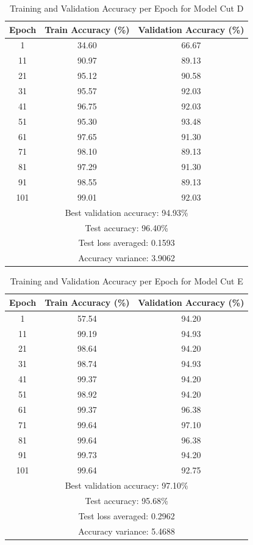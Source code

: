 \documentclass[11pt]{scrartcl}
\begin{document}
\begin{table}[htbp]
\centering
\caption{Training and Validation Accuracy per Epoch for Model Cut D}
\begin{tabular}{ccc}
\toprule
\textbf{Epoch} & \textbf{Train Accuracy (\%)} & \textbf{Validation Accuracy (\%)} \\
\midrule
1    & 34.60  & 66.67 \\
11   & 90.97  & 89.13 \\
21   & 95.12  & 90.58 \\
31   & 95.57  & 92.03 \\
41   & 96.75  & 92.03 \\
51   & 95.30  & 93.48 \\
61   & 97.65  & 91.30 \\
71   & 98.10  & 89.13 \\
81   & 97.29  & 91.30 \\
91   & 98.55  & 89.13 \\
101  & 99.01  & 92.03 \\
\midrule
\multicolumn{3}{c}{Best validation accuracy: 94.93\%} \\
\midrule
\multicolumn{3}{c}{Test accuracy: 96.40\%} \\
\multicolumn{3}{c}{Test loss averaged: 0.1593} \\
\multicolumn{3}{c}{Accuracy variance: 3.9062} \\
\bottomrule
\end{tabular}
\label{tab:task3-bonus-cutd-accuracy}
\end{table}

\begin{table}[htbp]
\centering
\caption{Training and Validation Accuracy per Epoch for Model Cut E}
\begin{tabular}{ccc}
\toprule
\textbf{Epoch} & \textbf{Train Accuracy (\%)} & \textbf{Validation Accuracy (\%)} \\
\midrule
1    & 57.54  & 94.20 \\
11   & 99.19  & 94.93 \\
21   & 98.64  & 94.20 \\
31   & 98.74  & 94.93 \\
41   & 99.37  & 94.20 \\
51   & 98.92  & 94.20 \\
61   & 99.37  & 96.38 \\
71   & 99.64  & 97.10 \\
81   & 99.64  & 96.38 \\
91   & 99.73  & 94.20 \\
101  & 99.64  & 92.75 \\
\midrule
\multicolumn{3}{c}{Best validation accuracy: 97.10\%} \\
\midrule
\multicolumn{3}{c}{Test accuracy: 95.68\%} \\
\multicolumn{3}{c}{Test loss averaged: 0.2962} \\
\multicolumn{3}{c}{Accuracy variance: 5.4688} \\
\bottomrule
\end{tabular}
\label{tab:task3-bonus-cute-accuracy}
\end{table}
\end{document}
